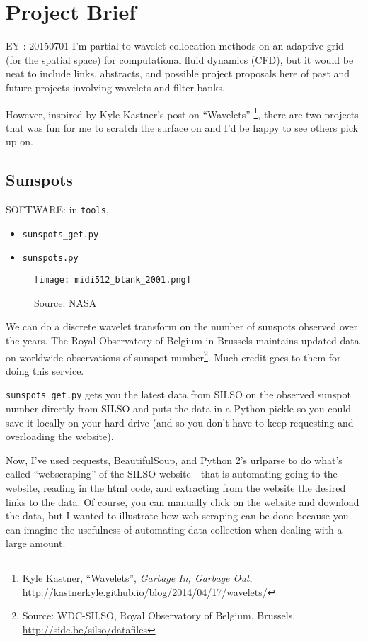 \documentclass[twoside]{amsart}
\theoremstyle{plain}
\theoremstyle{definition}
\theoremstyle{remark}
\numberwithin{equation}{section}
\begin{document}
\section{Project Brief}

EY : 20150701 I'm partial to wavelet collocation methods on an adaptive grid (for the spatial space) for computational fluid dynamics (CFD), but it would be neat to include links, abstracts, and possible project proposals here of past and future projects involving wavelets and filter banks.   

However, inspired by Kyle Kastner's post on ``Wavelets'' \footnote{Kyle Kastner, ``Wavelets'', \emph{Garbage In, Garbage Out}, \url{http://kastnerkyle.github.io/blog/2014/04/17/wavelets/}}, there are two projects that was fun for me to scratch the surface on and I'd be happy to see others pick up on.

\subsection{Sunspots}


SOFTWARE: in \verb|tools|, 
\begin{itemize}
\item \verb|sunspots_get.py|
\item \verb|sunspots.py|
\end{itemize}

\begin{figure}[h!]
 \caption{Source: \href{http://science.nasa.gov/media/medialibrary/2008/09/30/30sep_blankyear_resources/midi512_blank_2001.gif}{NASA}}
 \centering
   \texttt{[image: midi512\_blank\_2001.png]}
\end{figure}


We can do a discrete wavelet transform on the number of sunspots observed over the years.  The Royal Observatory of Belgium in Brussels maintains updated data on worldwide observations of sunspot number\footnote{Source: WDC-SILSO, Royal Observatory of Belgium, Brussels, \url{http://sidc.be/silso/datafiles}}.  Much credit goes to them for doing this service.  

\verb|sunspots_get.py| gets you the latest data from SILSO on the observed sunspot number directly from SILSO and puts the data in a Python pickle so you could save it locally on your hard drive (and so you don't have to keep requesting and overloading the website).  

Now, I've used requests, BeautifulSoup, and Python 2's urlparse to do what's called ``webscraping'' of the SILSO website - that is automating going to the website, reading in the html code, and extracting from the website the desired links to the data.  Of course, you can manually click on the website and download the data, but I wanted to illustrate how web scraping can be done because you can imagine the usefulness of automating data collection when dealing with a large amount.  
\end{document}
